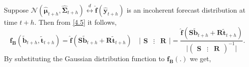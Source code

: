 \documentclass[a4paper, 11pt]{article}
\begin{document}
Suppose $\mathscr{N}(\hat{\bm{\mu}}_{t+h}, \hat{\bm{\Sigma}}_{t+h}) \overset{d}{\leftrightarrow} \hat{\bm{f}}(\hat{\bm{y}}_{t+h})$ is an incoherent forecast distribution at time $t+h$. Then from \eqref{4.5} it follows,
\begin{equation*}
\bm{f_B}(\tilde{\bm{b}}_{t+h},\tilde{\bm{t}}_{t+h})=\hat{\bm{f}}(\bm{S}\tilde{\bm{b}}_{t+h}+\bm{R}\tilde{\bm{t}}_{t+h}) \quad \Big|\begin{array}{ccc}\bm{S} & \vdots& \bm{R}\end{array}\Big| = \frac{\hat{\bm{f}}(\bm{S}\tilde{\bm{b}}_{t+h}+\bm{R}\tilde{\bm{t}}_{t+h}) }{\Big|(\begin{array}{ccc}\bm{S} & \vdots& \bm{R}\end{array})^{-1} \Big|}.
\end{equation*}
By substituting the Gaussian distribution function to $\bm{f_B}(.)$ we get,
\end{document}
